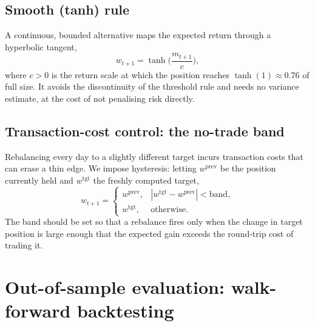 \documentclass[11pt]{article}
\theoremstyle{plain}
\theoremstyle{definition}
\theoremstyle{remark}
\begin{document}
\subsection{Smooth (tanh) rule}
A continuous, bounded alternative maps the expected return through a hyperbolic
tangent,
\begin{equation}
  w_{t+1} = \tanh\!\Big(\frac{m_{t+1}}{c}\Big),
\end{equation}
where $c>0$ is the return scale at which the position reaches
$\tanh(1)\approx0.76$ of full size. It avoids the discontinuity of the threshold
rule and needs no variance estimate, at the cost of not penalising risk
directly.

\subsection{Transaction-cost control: the no-trade band}
Rebalancing every day to a slightly different target incurs transaction costs
that can erase a thin edge. We impose hysteresis: letting $w^{\text{prev}}$ be the
position currently held and $w^{\text{tgt}}$ the freshly computed target,
\begin{equation}
  w_{t+1} =
  \begin{cases}
    w^{\text{prev}}, & |w^{\text{tgt}}-w^{\text{prev}}| < \text{band},\\
    w^{\text{tgt}}, & \text{otherwise.}
  \end{cases}
\end{equation}
The band should be set so that a rebalance fires only when the change in target
position is large enough that the expected gain exceeds the round-trip cost of
trading it.

\section{Out-of-sample evaluation: walk-forward backtesting}\label{sec:backtest}
\end{document}
